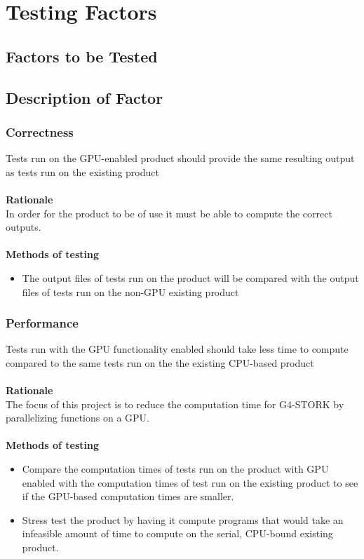 \documentclass[12pt]{article}
\begin{document}
\section{Testing Factors}

\subsection{Factors to be Tested} %

\subsection{Description of Factor} %
\subsubsection{Correctness}
Tests run on the GPU-enabled product should provide the same resulting output as tests run on the existing product\\\\
\textbf{Rationale}\\
In order for the product to be of use it must be able to compute the correct outputs.\\\\
\textbf{Methods of testing}
\begin{itemize}
\item The output files of tests run on the product will be compared with the output files of tests run on the non-GPU existing product
\end{itemize}

\subsubsection{Performance}
Tests run with the GPU functionality enabled should take less time to compute compared to the same tests run on the the existing CPU-based product\\\\
\textbf{Rationale}\\
The focus of this project is to reduce the computation time for G4-STORK by parallelizing functions on a GPU. \\\\
\textbf{Methods of testing}
\begin{itemize}
\item Compare the computation times of tests run on the product with GPU enabled with the computation times of test run on the existing product to see if the GPU-based computation times are smaller.
\item Stress test the product by having it compute programs that would take an infeasible amount of time to compute on the serial, CPU-bound existing product.
\end{itemize}
\end{document}
